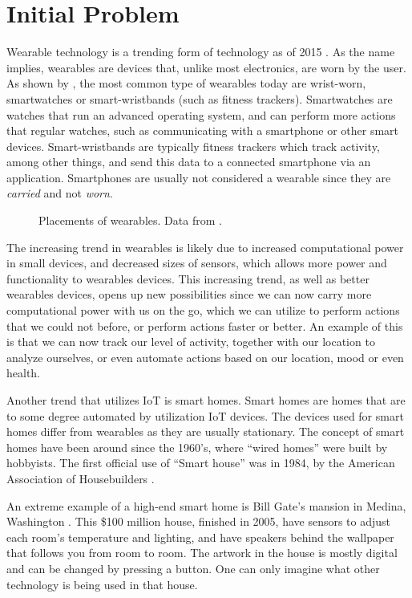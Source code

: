 \section{Initial Problem}\label{sec:initproblem}
Wearable technology is a trending form of technology as of 2015 \cite{WEARABLESTREND}. 
As the name implies, wearables are devices that, 
unlike most electronics, are worn by the user. 
As shown by , 
the most common type of wearables today are wrist-worn, 
\eg smartwatches or smart-wristbands (such as fitness trackers).
Smartwatches are watches that run an advanced operating system, 
and can perform more actions that regular watches, 
such as communicating with a smartphone or other smart devices.
Smart-wristbands are typically fitness trackers which track activity, among other things, 
and send this data to a connected smartphone via an application. 
Smartphones are usually not considered a wearable since they are \emph{carried} and not \emph{worn}. 

\begin{figure}[!htb]
  \centering
  
  \caption{Placements of wearables. Data from \protect\cite{LISTOFWEARABLES}.}
  \label{fig:wearables-placement}
\end{figure}

The increasing trend in wearables is likely due to increased computational power in small devices, 
and decreased sizes of sensors, 
which allows more power and functionality to wearables devices. 
This increasing trend, as well as better wearables devices, 
opens up new possibilities since we can now carry more computational power with us on the go, 
which we can utilize to perform actions that we could not before, 
or perform actions faster or better. 
An example of this is that we can now track our level of activity, 
together with our location to analyze ourselves, 
or even automate actions based on our location, mood or even health. 

Another trend that utilizes IoT is smart homes.
Smart homes are homes that are to some degree automated by utilization IoT devices. 
The devices used for smart homes differ from wearables as they are usually stationary. 
The concept of smart homes have been around since the 1960's, 
where ``wired homes'' were built by hobbyists. 
The first official use of ``Smart house'' was in 1984, 
by the American Association of Housebuilders \cite{harper2003}.

An extreme example of a high-end smart home is Bill Gate's mansion in Medina, Washington \cite{billgatehouse}.
This \$100 million house, finished in 2005, 
have sensors to adjust each room's temperature and lighting, 
and have speakers behind the wallpaper that follows you from room to room. 
The artwork in the house is mostly digital and can be changed by pressing a button. 
One can only imagine what other technology is being used in that house. 

